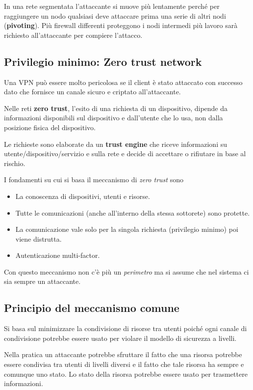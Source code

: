 In una rete segmentata l'attaccante si muove più lentamente perché per raggiungere un nodo qualsiasi deve attaccare
prima una serie di altri nodi (\textbf{pivoting}). Più firewall differenti proteggono i nodi intermedi più lavoro sarà
richiesto all'attaccante per compiere l'attacco.

\subsection{Privilegio minimo: Zero trust network}
Una VPN può essere molto pericolosa se il client è stato attaccato con successo dato che fornisce un canale sicuro e
criptato all'attaccante.

Nelle reti \textbf{zero trust}, l'esito di una richiesta di un dispositivo, dipende da informazioni disponibili sul
dispositivo e dall'utente che lo usa, non dalla posizione fisica del dispositivo.

Le richieste sono elaborate da un \textbf{trust engine} che riceve informazioni su utente/dispositivo/servizio e sulla
rete e decide di accettare o rifiutare in base al rischio.

I fondamenti su cui si basa il meccanismo di \emph{zero trust} sono
\begin{itemize}
	\item La conoscenza di dispositivi, utenti e risorse.
	\item Tutte le comunicazioni (anche all'interno della stessa sottorete) sono protette.
	\item La comunicazione vale solo per la singola richiesta (privilegio minimo) poi viene distrutta.
	\item Autenticazione multi-factor.
\end{itemize}
Con questo meccanismo non c'è più un \emph{perimetro} ma si assume che nel sistema ci sia sempre un attaccante.

\subsection{Principio del meccanismo comune}
Si basa sul minimizzare la condivisione di risorse tra utenti poiché ogni canale di condivisione potrebbe essere
usato per violare il modello di sicurezza a livelli.

Nella pratica un attaccante potrebbe sfruttare il fatto che una risorsa potrebbe essere condivisa tra utenti di
livelli diversi e il fatto che tale risorsa ha sempre e comunque uno stato. Lo stato della risorsa potrebbe essere
usato per trasmettere informazioni.

